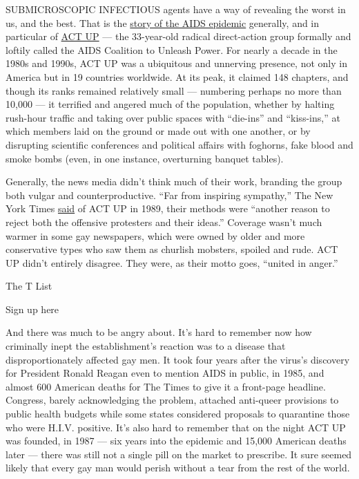 SUBMICROSCOPIC INFECTIOUS agents have a way of revealing the worst in
us, and the best. That is the
\href{https://www.nytimes.com/2018/04/27/t-magazine/times-journalists-aids-gay-history.html}{story
of the AIDS epidemic} generally, and in particular of
\href{https://actupny.com/}{ACT UP} --- the 33-year-old radical
direct-action group formally and loftily called the AIDS Coalition to
Unleash Power. For nearly a decade in the 1980s and 1990s, ACT UP was a
ubiquitous and unnerving presence, not only in America but in 19
countries worldwide. At its peak, it claimed 148 chapters, and though
its ranks remained relatively small --- numbering perhaps no more than
10,000 --- it terrified and angered much of the population, whether by
halting rush-hour traffic and taking over public spaces with ``die-ins''
and ``kiss-ins,'' at which members laid on the ground or made out with
one another, or by disrupting scientific conferences and political
affairs with foghorns, fake blood and smoke bombs (even, in one
instance, overturning banquet tables).

Generally, the news media didn't think much of their work, branding the
group both vulgar and counterproductive. ``Far from inspiring
sympathy,'' The New York Times
\href{https://www.nytimes.com/1989/12/12/opinion/the-storming-of-st-pat-s.html}{said}
of ACT UP in 1989, their methods were ``another reason to reject both
the offensive protesters and their ideas.'' Coverage wasn't much warmer
in some gay newspapers, which were owned by older and more conservative
types who saw them as churlish mobsters, spoiled and rude. ACT UP didn't
entirely disagree. They were, as their motto goes, ``united in anger.''

The T List \textbar{}

Sign up here

And there was much to be angry about. It's hard to remember now how
criminally inept the establishment's reaction was to a disease that
disproportionately affected gay men. It took four years after the
virus's discovery for President Ronald Reagan even to mention AIDS in
public, in 1985, and almost 600 American deaths for The Times to give it
a front-page headline. Congress, barely acknowledging the problem,
attached anti-queer provisions to public health budgets while some
states considered proposals to quarantine those who were H.I.V.
positive. It's also hard to remember that on the night ACT UP was
founded, in 1987 --- six years into the epidemic and 15,000 American
deaths later --- there was still not a single pill on the market to
prescribe. It sure seemed likely that every gay man would perish without
a tear from the rest of the world.

